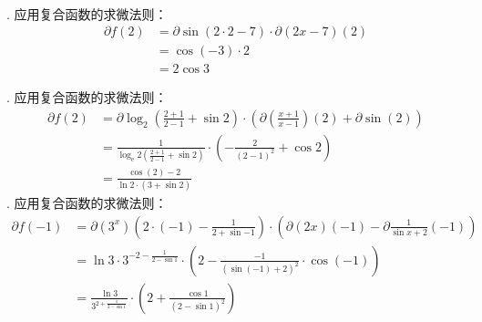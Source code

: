 \documentclass[12pt,UTF8]{ctexbook}
\begin{document}
\begin{so}
    \mbox{} \\
    . 应用复合函数的求微法则：
    \begin{align*}
        \partial f(2) &= \partial \sin (2 \cdot 2 - 7) \cdot \partial (2x - 7) (2)  \\
        &= \cos{(-3)} \cdot 2  \\
        &= 2 \cos{3}   
    \end{align*}
    
    . 应用复合函数的求微法则：
    \begin{align*}
        \partial f(2) &= \partial \log_2 \left(\frac{2+1}{2-1} + \sin{2}\right) \cdot \left(\partial \left(\frac{x+1}{x-1}\right) (2) + \partial \sin (2) \right) \\
        &= \frac{1}{\log_{\mathrm{e}}{2} \left(\frac{2+1}{2-1} + \sin{2}\right)} \cdot \left( -\frac{2}{(2 - 1)^2} + \cos{2} \right)  \\
        &= \frac{\cos{(2)} - 2}{\ln{2} \cdot (3 + \sin{2})}   
    \end{align*}
    . 应用复合函数的求微法则：
    \begin{align*}
        \partial f(-1) &= \partial (3^x) (2\cdot (-1) - \frac{1}{2 + \sin{-1}}) \cdot \left(\partial (2x) (-1) - \partial \frac{1}{\sin{x} + 2} (-1) \right)  \\
        &= \ln{3} \cdot 3^{-2 - \frac{1}{2 - \sin{1}}} \cdot \left(2 - \frac{-1}{(\sin{(-1)} + 2)^2} \cdot \cos{(-1)} \right)  \\
        &= \frac{\ln{3}}{3^{2 + \frac{1}{2 - \sin{1}}}} \cdot \left(2 + \frac{\cos{1}}{(2 - \sin{1})^2}\right)  
    \end{align*}

\end{so}
\end{document}
